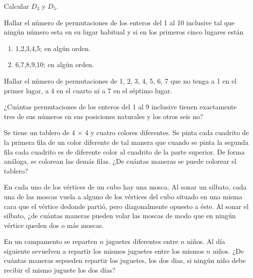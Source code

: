 \begin{ejercicio}
    Calcular $D_3$ y $D_5$.
\end{ejercicio}

\begin{ejercicio}
    Hallar el número de permutaciones de los enteros del 1 al 10 inclusive tal que ningún número esta en su lugar habitual y si en los primeros cinco lugares están

    \renewcommand{\labelenumi}{\alph{enumi})}
    \begin{enumerate}
        \item 1,2,3,4,5; en algún orden.
        \item 6,7,8,9,10; en algún orden.
    \end{enumerate}
\end{ejercicio}

\begin{ejercicio}
    Hallar el número de permutaciones de 1, 2, 3, 4, 5, 6, 7 que no tenga a 1 en el primer lugar, a 4 en el cuarto ni a 7 en el séptimo lugar.
\end{ejercicio}

\begin{ejercicio}
    ¿Cuántas permutaciones de los enteros del 1 al 9 inclusive tienen exactamente tres de sus números en sus posiciones naturales y los otros seis no?
\end{ejercicio}

\begin{ejercicio}
    Se tiene un tablero de 4 × 4 y cuatro colores diferentes. Se pinta cada cuadrito de la primera fila de un color diferente de tal manera que cuando se pinta la segunda fila cada cuadrito es de diferente color al cuadrito de la parte superior. De forma análoga, se colorean las demás filas. ¿De cuántas maneras se puede colorear el tablero?
\end{ejercicio}

\begin{ejercicio}
    En cada uno de los vértices de un cubo hay una mosca. Al sonar un silbato, cada una de las moscas vuela a alguno de los vértices del cubo situado en una misma cara que el vértice dedonde partió, pero diagonalmente opuesto a éste. Al sonar el silbato, ¿de cuántas maneras pueden volar las moscas de modo que en ningún vértice queden dos o más moscas.
\end{ejercicio}

\begin{ejercicio}
    En un campamento se reparten $n$ juguetes diferentes entre $n$ niños. Al día siguiente sevuelven a repartir los mismos juguetes entre los mismos $n$ niños. ¿De cuántas maneras sepueden repartir los juguetes, los dos dias, si ningún niño debe recibir el mismo juguete los dos días?
\end{ejercicio}

